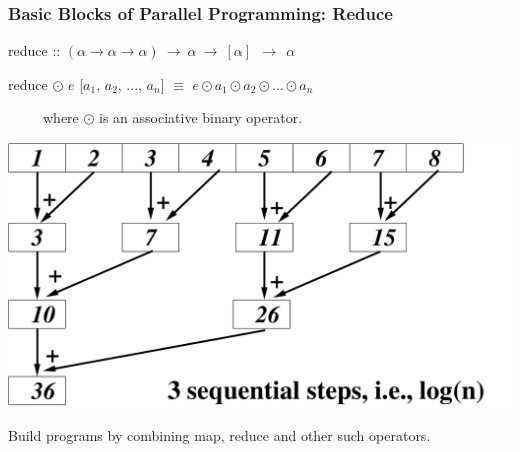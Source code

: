 \documentclass{beamer}
\renewcommand{\emph}[1]{\textcolor{structure}{#1}}
\newcommand{\emp}[1]{\textcolor{DikuRed}{ #1}}
\begin{document}
\begin{frame}[fragile,t]
   \frametitle{Basic Blocks of Parallel Programming: Reduce}

\bigskip

\emp{reduce} :: $(\alpha \to \alpha \to \alpha) ~\to~ \alpha ~\to~ [\alpha] ~~\to~~ \alpha$

\smallskip

\emp{reduce} $\odot$ $e$ [$a_1$, $a_2$, ..., $a_n$] $\equiv$ \emph{$e \odot a_1 \odot a_2 \odot ... \odot a_n$}

\smallskip

~~~~~where $\odot$ is an associative binary operator.

\bigskip

\begin{center} 
        \includegraphics[height=25ex]{Figures/ReduceEg.pdf} 
\end{center} 

Build programs by combining \emp{map}, \emp{reduce} and other such operators. %

\end{frame}
\end{document}
